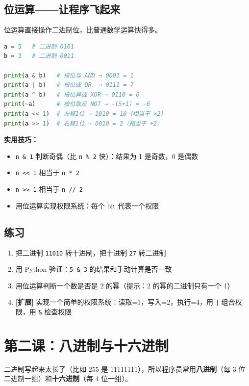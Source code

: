 \documentclass[a4paper,12pt]{ctexart}
\begin{document}
\subsection*{位运算——让程序飞起来}

位运算直接操作二进制位，比普通数学运算快得多。

\begin{lstlisting}[language=Python]
a = 5   # 二进制 0101
b = 3   # 二进制 0011

print(a & b)   # 按位与 AND → 0001 = 1
print(a | b)   # 按位或 OR  → 0111 = 7
print(a ^ b)   # 按位异或 XOR → 0110 = 6
print(~a)      # 按位取反 NOT → -(5+1) = -6
print(a << 1)  # 左移1位 → 1010 = 10（相当于 ×2）
print(a >> 1)  # 右移1位 → 0010 = 2（相当于 ÷2）
\end{lstlisting}

\textbf{实用技巧：}
\begin{itemize}
  \item \texttt{n \& 1} 判断奇偶（比 \texttt{n \% 2} 快）：结果为 1 是奇数，0 是偶数
  \item \texttt{n << 1} 相当于 \texttt{n * 2}
  \item \texttt{n >> 1} 相当于 \texttt{n // 2}
  \item 用位运算实现权限系统：每个 bit 代表一个权限
\end{itemize}

\subsection*{练习}

\begin{enumerate}
  \item 把二进制 \texttt{11010} 转十进制，把十进制 \texttt{27} 转二进制
  \item 用 Python 验证：\texttt{5 \& 3} 的结果和手动计算是否一致
  \item 用位运算判断一个数是否是 2 的幂（提示：2 的幂的二进制只有一个 1）
  \item \textbf{[扩展]} 实现一个简单的权限系统：读取=1，写入=2，执行=4，用 \texttt{|} 组合权限，用 \texttt{\&} 检查权限
\end{enumerate}

\section*{第二课：八进制与十六进制}

二进制写起来太长了（比如 255 是 11111111），所以程序员常用\textbf{八进制}（每 3 位二进制一组）和\textbf{十六进制}（每 4 位一组）。
\end{document}
